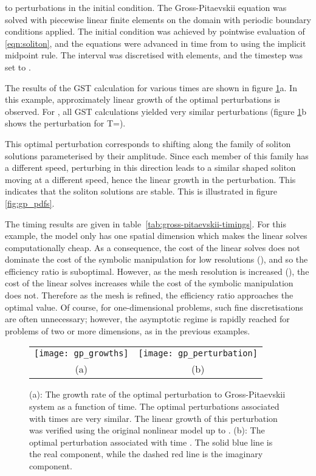 \documentclass{siamltex}
\begin{document}
to perturbations in the initial condition. The Gross-Pitaevskii equation was solved with piecewise linear finite elements on the domain 
with periodic boundary conditions applied. The initial condition was achieved by pointwise evaluation of \eqref{eqn:soliton}, and the equations were
advanced in time from  to  using the implicit midpoint rule. The interval was discretised with
 elements, and the timestep was set to .

The results of the GST calculation for various times are shown in
figure \ref{fig:gp_growths}a. In this example, approximately linear
growth of the optimal perturbations is observed. For , all GST
calculations yielded very similar perturbations (figure \ref{fig:gp_growths}b shows the
perturbation for T=). 

This optimal perturbation corresponds to
shifting along the family of soliton solutions parameterised by their amplitude. Since each
member of this family has a different speed, perturbing in this
direction leads to a similar shaped soliton moving at a different
speed, hence the linear growth in the perturbation. This indicates that the soliton
solutions are stable. This is illustrated in figure \ref{fig:gp_pdfs}.

The timing results are given in table~\ref{tab:gross-pitaevskii-timings}. 
For this example, the model only has one spatial dimension which makes the linear solves computationally cheap.
As a consequence, the cost of the linear solves does not dominate the cost of the symbolic manipulation for low resolutions (),
and so the efficiency ratio is suboptimal.
However, as the mesh resolution is increased (), the cost of the linear solves increases while the cost of the symbolic manipulation 
does not. Therefore as the mesh is refined, the efficiency ratio approaches the optimal value. Of course, for one-dimensional problems, such fine
discretisations are often unnecessary; however, the asymptotic regime is rapidly reached for problems of two or more dimensions, as in the previous
examples.

\begin{figure}
  \centering
  \begin{tabular}{cc}
    \texttt{[image: gp\_growths]} &
    \texttt{[image: gp\_perturbation]} \\
    (a) & (b)
  \end{tabular}
  \caption{(a): The growth rate of the optimal perturbation to Gross-Pitaevskii system as a function of time. The optimal perturbations associated with times  are very similar. The linear growth of this perturbation was verified using the original nonlinear model up to . (b): The optimal perturbation associated with time . The solid blue line is the real component, while the dashed red line is the imaginary component.}
  \label{fig:gp_growths}
\end{figure}
\end{document}
